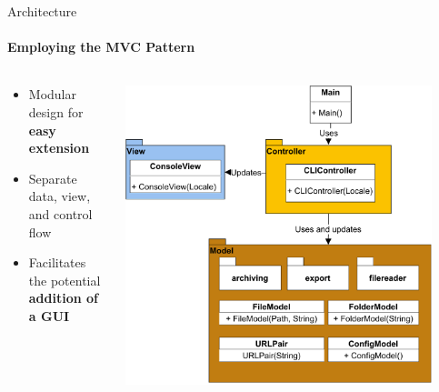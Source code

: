 \documentclass[
    ngerman,%
    authorontitle=true,
]{bfhbeamer}
\begin{document}
	\begin{frame}{Architecture}
		\framesubtitle{Employing the \textbf{MVC} Pattern}
		
		\begin{columns} %
			\begin{column}{0.5\textwidth} %
				\begin{itemize}
					\item Modular design for \textbf{easy extension}
					\item Separate data, view, and control flow
					\item Facilitates the potential \textbf{addition of a GUI}
				\end{itemize}
			\end{column}
			
			\begin{column}{0.5\textwidth} %
				\begin{center}
					\includegraphics[width=0.9\textwidth]{pictures/final_presentation/mvc_diagram-Highlevel_MV_Presentation.pdf}
				\end{center}
			\end{column}
		\end{columns} %
	\end{frame}
\end{document}
